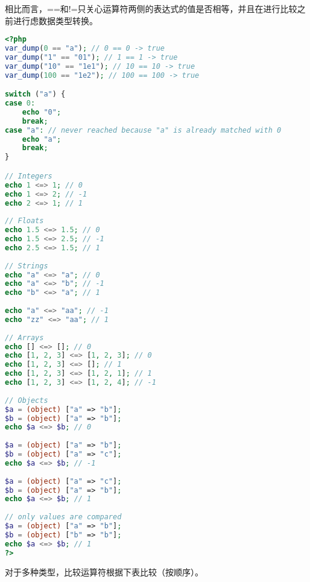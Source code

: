 相比而言，=\/=和!=只关心运算符两侧的表达式的值是否相等，并且在进行比较之前进行虑数据类型转换。

\begin{lstlisting}[language=PHP]
<?php
var_dump(0 == "a"); // 0 == 0 -> true
var_dump("1" == "01"); // 1 == 1 -> true
var_dump("10" == "1e1"); // 10 == 10 -> true
var_dump(100 == "1e2"); // 100 == 100 -> true

switch ("a") {
case 0:
    echo "0";
    break;
case "a": // never reached because "a" is already matched with 0
    echo "a";
    break;
}

// Integers
echo 1 <=> 1; // 0
echo 1 <=> 2; // -1
echo 2 <=> 1; // 1
 
// Floats
echo 1.5 <=> 1.5; // 0
echo 1.5 <=> 2.5; // -1
echo 2.5 <=> 1.5; // 1
 
// Strings
echo "a" <=> "a"; // 0
echo "a" <=> "b"; // -1
echo "b" <=> "a"; // 1
 
echo "a" <=> "aa"; // -1
echo "zz" <=> "aa"; // 1
 
// Arrays
echo [] <=> []; // 0
echo [1, 2, 3] <=> [1, 2, 3]; // 0
echo [1, 2, 3] <=> []; // 1
echo [1, 2, 3] <=> [1, 2, 1]; // 1
echo [1, 2, 3] <=> [1, 2, 4]; // -1
 
// Objects
$a = (object) ["a" => "b"]; 
$b = (object) ["a" => "b"]; 
echo $a <=> $b; // 0
 
$a = (object) ["a" => "b"]; 
$b = (object) ["a" => "c"]; 
echo $a <=> $b; // -1
 
$a = (object) ["a" => "c"]; 
$b = (object) ["a" => "b"]; 
echo $a <=> $b; // 1
 
// only values are compared
$a = (object) ["a" => "b"]; 
$b = (object) ["b" => "b"]; 
echo $a <=> $b; // 1
?>
\end{lstlisting}

对于多种类型，比较运算符根据下表比较（按顺序）。



